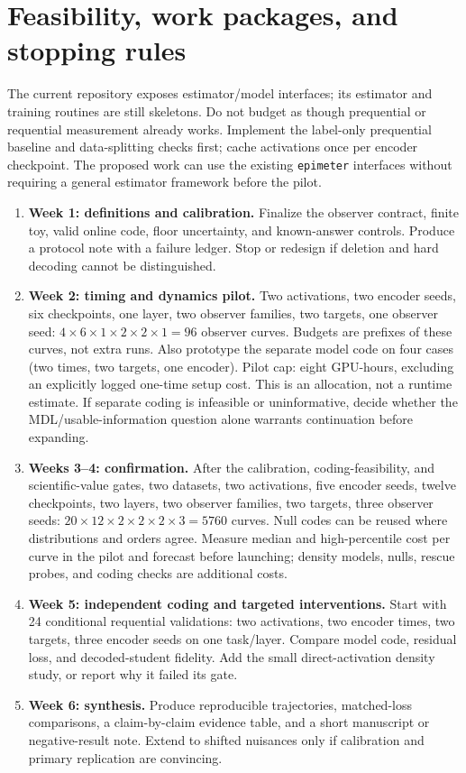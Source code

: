 \documentclass[11pt,a4paper]{article}
\begin{document}
\section{Feasibility, work packages, and stopping rules}

The current repository exposes estimator/model interfaces; its estimator and training routines are still skeletons. Do not budget as though prequential or requential measurement already works. Implement the label-only prequential baseline and data-splitting checks first; cache activations once per encoder checkpoint. The proposed work can use the existing \texttt{epimeter} interfaces without requiring a general estimator framework before the pilot.

\begin{enumerate}
\item \textbf{Week 1: definitions and calibration.} Finalize the observer contract, finite toy, valid online code, floor uncertainty, and known-answer controls. Produce a protocol note with a failure ledger. Stop or redesign if deletion and hard decoding cannot be distinguished.
\item \textbf{Week 2: timing and dynamics pilot.} Two activations, two encoder seeds, six checkpoints, one layer, two observer families, two targets, one observer seed: $4\times6\times1\times2\times2\times1=96$ observer curves. Budgets are prefixes of these curves, not extra runs. Also prototype the separate model code on four cases (two times, two targets, one encoder). Pilot cap: eight GPU-hours, excluding an explicitly logged one-time setup cost. This is an allocation, not a runtime estimate. If separate coding is infeasible or uninformative, decide whether the MDL/usable-information question alone warrants continuation before expanding.
\item \textbf{Weeks 3--4: confirmation.} After the calibration, coding-feasibility, and scientific-value gates, two datasets, two activations, five encoder seeds, twelve checkpoints, two layers, two observer families, two targets, three observer seeds: $20\times12\times2\times2\times2\times3=5760$ curves. Null codes can be reused where distributions and orders agree. Measure median and high-percentile cost per curve in the pilot and forecast before launching; density models, nulls, rescue probes, and coding checks are additional costs.
\item \textbf{Week 5: independent coding and targeted interventions.} Start with 24 conditional requential validations: two activations, two encoder times, two targets, three encoder seeds on one task/layer. Compare model code, residual loss, and decoded-student fidelity. Add the small direct-activation density study, or report why it failed its gate.
\item \textbf{Week 6: synthesis.} Produce reproducible trajectories, matched-loss comparisons, a claim-by-claim evidence table, and a short manuscript or negative-result note. Extend to shifted nuisances only if calibration and primary replication are convincing.
\end{enumerate}
\end{document}
